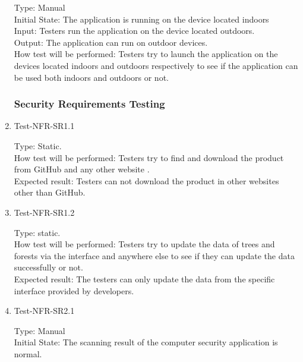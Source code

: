 \documentclass[12pt, titlepage]{article}
\begin{document}
\begin{enumerate}
Type: Manual\\

Initial State: The application is running on the device located indoors\\

Input: Testers run the application on the device located outdoors.\\

Output: The application can run on outdoor devices.\\

How test will be performed: Testers try to launch the application on the devices located indoors and outdoors respectively to see if the application can be used both indoors and outdoors or not.  


\subsubsection{Security Requirements Testing}

\item{Test-NFR-SR1.1\\}

Type: Static.\\

How test will be performed: Testers try to find and download the product from GitHub and any other website .\\

Expected result: Testers can not download the product in other websites other than GitHub.

\item{Test-NFR-SR1.2\\}

Type: static.\\

How test will be performed: Testers try to update the data of trees and forests via the interface and anywhere else to see if they can update the data successfully or not.\\

Expected result: The testers can only update the data from the specific interface provided by developers.


\item{Test-NFR-SR2.1\\}

Type: Manual\\

Initial State: The scanning result of the computer security application is normal. \\


\end{enumerate}
\end{document}
